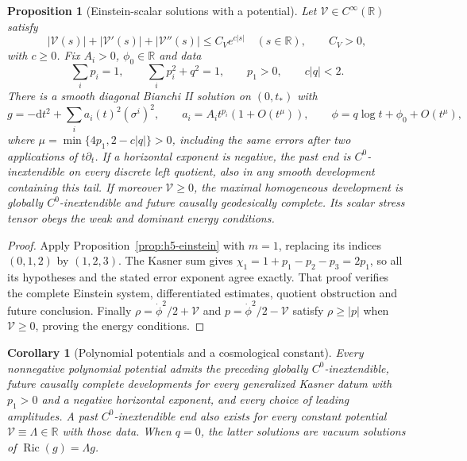 \documentclass[10pt,a4paper]{article}
\numberwithin{equation}{section}
\newtheorem{proposition}[theorem]{Proposition}
\newtheorem{corollary}[theorem]{Corollary}
\theoremstyle{definition}
\theoremstyle{remark}
\newcommand{\R}{\mathbb R}
\newcommand{\dd}{\mathrm d}
\newcommand{\Ric}{\operatorname{Ric}}
\begin{document}
\begin{proposition}[Einstein-scalar solutions with a potential]
\label{prop:potential-solutions}
Let $\mathcal V\in C^\infty(\R)$ satisfy
\begin{equation}
 |\mathcal V(s)|+|\mathcal V'(s)|+|\mathcal V''(s)|
 \le C_Ve^{c|s|}\quad(s\in\R),\qquad C_V>0,
 \label{eq:potential-growth}
\end{equation}
with $c\ge0$.  Fix $A_i>0$, $\phi_0\in\R$ and data
\begin{equation}
 \sum_i p_i=1,\qquad \sum_i p_i^2+q^2=1,
 \qquad p_1>0,\qquad c|q|<2.
 \label{eq:potential-data}
\end{equation}
There is a smooth diagonal Bianchi II solution on $(0,t_*)$ with
\begin{equation}
 g=-\dd t^2+\sum_i a_i(t)^2(\sigma^i)^2,\qquad
 a_i=A_it^{p_i}(1+O(t^\mu)),\qquad
 \phi=q\log t+\phi_0+O(t^\mu),
 \label{eq:potential-asymptotics}
\end{equation}
where $\mu=\min\{4p_1,2-c|q|\}>0$, including the same errors
after two applications of $t\partial_t$.  If a horizontal
exponent is negative, the past end is $C^0$-inextendible on
every discrete left quotient, also in any smooth development
containing this tail.  If moreover $\mathcal V\ge0$, the maximal
homogeneous development is globally $C^0$-inextendible and future
causally geodesically complete.  Its scalar stress tensor obeys
the weak and dominant energy conditions.
\end{proposition}

\begin{proof}
Apply Proposition~\ref{prop:h5-einstein} with $m=1$, replacing
its indices $(0,1,2)$ by $(1,2,3)$.  The Kasner sum gives
$\chi_1=1+p_1-p_2-p_3=2p_1$, so all its hypotheses and the
stated error exponent agree exactly.  That proof verifies the
complete Einstein system, differentiated estimates, quotient
obstruction and future conclusion.  Finally
$\rho=\dot\phi^2/2+\mathcal V$ and
$p=\dot\phi^2/2-\mathcal V$ satisfy $\rho\ge|p|$ when
$\mathcal V\ge0$, proving the energy conditions.
\end{proof}

\begin{corollary}[Polynomial potentials and a cosmological constant]
\label{cor:polynomial-potential}
Every nonnegative polynomial potential admits the preceding
globally $C^0$-inextendible, future causally complete developments
for every generalized Kasner datum with $p_1>0$ and a negative
horizontal exponent, and every choice of leading amplitudes.
A past $C^0$-inextendible end also exists for every constant
potential $\mathcal V\equiv\Lambda\in\R$ with those data.
When $q=0$, the latter solutions are vacuum solutions of
$\Ric(g)=\Lambda g$.
\end{corollary}
\end{document}
